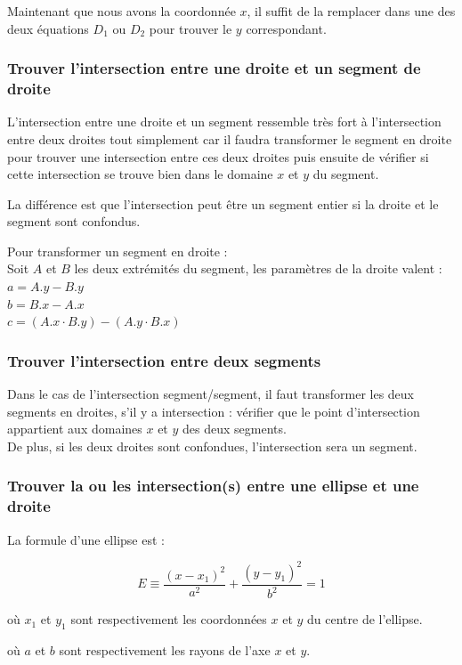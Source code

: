 \documentclass[]{report}
\begin{document}
Maintenant que nous avons la coordonnée $x$, il suffit de la remplacer
dans une des deux équations $D_1$ ou $D_2$ pour trouver le $y$ 
correspondant.

\subsubsection{Trouver l'intersection entre une droite et un segment de droite}

L'intersection entre une droite et un segment ressemble très fort
à l'intersection entre deux droites tout simplement car il faudra transformer
le segment en droite pour trouver une intersection entre ces deux droites
puis ensuite de vérifier si cette intersection se trouve bien dans le domaine
$x$ et $y$ du segment.

La différence est que l'intersection peut être un segment entier si la droite
et le segment sont confondus.

Pour transformer un segment en droite : \\
Soit $A$ et $B$ les deux extrémités du segment, les paramètres de la droite valent : 
$ a = A.y - B.y $ \\
$ b = B.x - A.x $ \\
$ c = (A.x \cdot B.y) - (A.y \cdot B.x) $ \\

\subsubsection{Trouver l'intersection entre deux segments}

Dans le cas de l'intersection segment/segment, il faut transformer les
deux segments en droites, s'il y a intersection : vérifier que le point
d'intersection appartient aux domaines $x$ et $y$ des deux segments. \\
De plus, si les deux droites sont confondues, l'intersection sera un segment.

\subsubsection{Trouver la ou les intersection(s) entre une ellipse et une droite}

La formule d'une ellipse est : 

$$ E \equiv \frac{(x - x_1)^2}{a^2} + \frac{(y - y_1)^2}{b^2} = 1 $$

\begin{description}
\item où $x_1$ et $y_1$ sont respectivement les coordonnées
$x$ et $y$ du centre de l'ellipse. 
\item où $a$ et $b$ sont respectivement les rayons de l'axe
$x$ et $y$. \\
\end{description}
\end{document}
